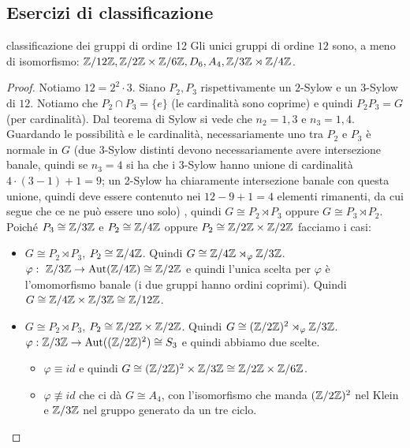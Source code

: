 \subsection{Esercizi di classificazione}
\begin{example2}{classificazione dei gruppi di ordine 12}
    Gli unici gruppi di ordine $12$ sono, a meno di isomorfismo: $\mathbb{Z}/12\mathbb{Z}, \mathbb{Z}/2\mathbb{Z}\times \mathbb{Z}/6\mathbb{Z}, D_6, A_4,\mathbb{Z}/3\mathbb{Z} \rtimes \mathbb{Z}/4\mathbb{Z}$.
\end{example2}
\begin{proof}
    Notiamo $12 = 2^2 \cdot 3$. Siano $P_2,P_3$ rispettivamente un $2$-Sylow e un $3$-Sylow di $12$. Notiamo che $P_2 \cap P_3 = \{e\}$ (le cardinalità sono coprime) e quindi $P_2 P_3 = G$ (per cardinalità). Dal teorema di Sylow si vede che $n_2 = 1, 3$ e $n_3 = 1, 4$.
    Guardando le possibilità e le cardinalità, necessariamente uno tra $P_2$ e $P_3$ è normale in $G$ { \tiny (due $3$-Sylow distinti devono necessariamente avere intersezione banale, quindi se $n_3 = 4$ si ha che i $3$-Sylow hanno unione di cardinalità $4\cdot (3-1) + 1 = 9$; un 2-Sylow ha chiaramente intersezione banale con questa unione, quindi deve essere contenuto nei $12 - 9 + 1 = 4$ elementi rimanenti, da cui segue che ce ne può essere uno solo) }, quindi $G \cong P_2 \rtimes P_3$ oppure $G \cong P_3 \rtimes P_2$. Poiché $P_3 \cong \mathbb{Z} / 3 \mathbb{Z}$ e $P_2 \cong \mathbb{Z} / 4 \mathbb{Z}$ oppure $P_2 \cong \mathbb{Z} / 2\mathbb{Z} \times \mathbb{Z} / 2\mathbb{Z}$ facciamo i casi: 
    \begin{itemize}
        \item $G \cong P_2 \rtimes P_3$, $P_2 \cong \mathbb{Z} / 4 \mathbb{Z}$. Quindi $G \cong  \mathbb{Z} / 4 \mathbb{Z} \rtimes_{\varphi} \mathbb{Z} / 3 \mathbb{Z}$. $\varphi : \  \mathbb{Z} / 3 \mathbb{Z} \rightarrow \text{Aut}(\mathbb{Z} / 4 \mathbb{Z}) \cong \mathbb{Z} / 2 \mathbb{Z}$ e quindi l'unica scelta per $\varphi$ è l'omomorfismo banale (i due gruppi hanno ordini coprimi). Quindi  $G \cong \mathbb{Z} / 4 \mathbb{Z} \times \mathbb{Z} / 3 \mathbb{Z} \cong \mathbb{Z} / 12 \mathbb{Z}$.
        \item $G \cong P_2 \rtimes P_3$, $P_2 \cong \mathbb{Z}/2\mathbb{Z} \times \mathbb{Z}/2\mathbb{Z}$. Quindi $G \cong  (\mathbb{Z}/2\mathbb{Z})^2 \rtimes_{\varphi} \mathbb{Z} / 3 \mathbb{Z}$. $\varphi :  \mathbb{Z} / 3 \mathbb{Z} \rightarrow \text{Aut}((\mathbb{Z}/2\mathbb{Z})^2) \cong S_3$ e quindi abbiamo due scelte.
        \begin{itemize}
            \item $\varphi \equiv id$ e quindi  $G \cong (\mathbb{Z} / 2 \mathbb{Z})^2 \times \mathbb{Z} / 3 \mathbb{Z} \cong \mathbb{Z} / 2 \mathbb{Z} \times \mathbb{Z} / 6 \mathbb{Z}$.
            \item $\varphi \not\equiv id$ che ci dà $G \cong A_4$, con l'isomorfismo che manda $(\mathbb{Z} / 2 \mathbb{Z})^2$ nel Klein e $\mathbb{Z} / 3 \mathbb{Z}$ nel gruppo generato da un tre ciclo.

\end{itemize}
\end{itemize}
\end{proof}
